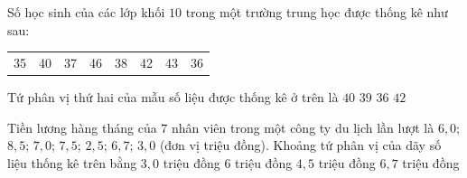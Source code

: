 

\begin{ex}%
	Số học sinh của các lớp khối $10$ trong một trường trung học được thống kê như sau:\begin{center}
	\begin{tabular}{cccccccc}
		35 & 40 & 37 & 46 & 38 & 42 &  43 & 36
	\end{tabular}
\end{center} Tứ phân vị thứ hai của mẫu số liệu được thống kê ở trên là
\choice 
	{$40$} 
	 {\True $39$}
	{$36$} 
	 {$42$}
\end{ex}

\begin{ex}%
	Tiền lương hàng tháng của $ 7 $ nhân viên trong một công ty du lịch lần lượt là  $ 6{,}0 $; $ 8{,}5 $; $ 7{,}0 $; $ 7{,}5 $; $ 2{,}5 $; $ 6{,}7 $; $ 3{,}0 $ (đơn vị triệu
	đồng). Khoảng tứ phân  vị của dãy số liệu thống kê trên bằng
	\choice 
		{$ 3{,}0 $ triệu đồng} 
		 {$ 6 $ triệu đồng}
		{\True $  4{,}5 $ triệu đồng}
		{$ 6{,}7 $ triệu đồng} 
\end{ex}

